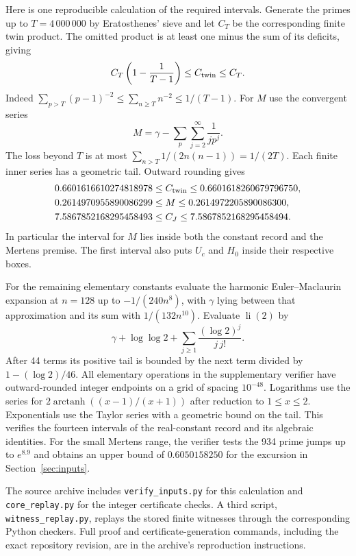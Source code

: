 \documentclass[11pt]{article}
\theoremstyle{remark}\newtheorem{remark}[theorem]{Remark}
\newcommand{\leanid}[1]{{\small\urlstyle{tt}\nolinkurl{#1}}}
\begin{document}
Here is one reproducible calculation of the required intervals. Generate the primes up to $T=4\,000\,000$ by Eratosthenes' sieve and let $C_T$ be the corresponding finite twin product. The omitted product is at least one minus the sum of its deficits, giving
\[
 C_T\left(1-\frac{1}{T-1}\right)\le C_{\rm twin}\le C_T.
\]
Indeed $\sum_{p>T}(p-1)^{-2}\le\sum_{n\ge T}n^{-2}\le 1/(T-1)$. For $M$ use the convergent series
\[
 M=\gamma-\sum_p\sum_{j=2}^\infty\frac{1}{jp^j}.
\]
The loss beyond $T$ is at most $\sum_{n>T}1/(2n(n-1))=1/(2T)$. Each finite inner series has a geometric tail. Outward rounding gives
\begin{align*}
 0.6601616610274818978&\le C_{\rm twin}\le0.6601618260679796750,\\
 0.2614970955890086299&\le M\le0.2614972205890086300,\\
 7.5867852168295458493&\le C_J\le7.5867852168295458494 .
\end{align*}
In particular the interval for $M$ lies inside both the constant record and the Mertens premise. The first interval also puts $U_c$ and $H_0$ inside their respective boxes.

For the remaining elementary constants evaluate the harmonic Euler--Maclaurin expansion at $n=128$ up to $-1/(240n^8)$, with $\gamma$ lying between that approximation and its sum with $1/(132n^{10})$. Evaluate $\operatorname{li}(2)$ by
\[
 \gamma+\log\log2+\sum_{j\ge1}\frac{(\log2)^j}{j\,j!}.
\]
After 44 terms its positive tail is bounded by the next term divided by $1-(\log2)/46$. All elementary operations in the supplementary verifier have outward-rounded integer endpoints on a grid of spacing $10^{-48}$. Logarithms use the series for $2\operatorname{arctanh}((x-1)/(x+1))$ after reduction to $1\le x\le2$. Exponentials use the Taylor series with a geometric bound on the tail. This verifies the fourteen intervals of the real-constant record and its algebraic identities. For the small Mertens range, the verifier tests the 934 prime jumps up to $e^{8.9}$ and obtains an upper bound of $0.6050158250$ for the excursion in Section~\ref{sec:inputs}.

The source archive includes \leanid{verify_inputs.py} for this calculation and \leanid{core_replay.py} for the integer certificate checks. A third script, \leanid{witness_replay.py}, replays the stored finite witnesses through the corresponding Python checkers. Full proof and certificate-generation commands, including the exact repository revision, are in the archive's reproduction instructions.
\end{document}
